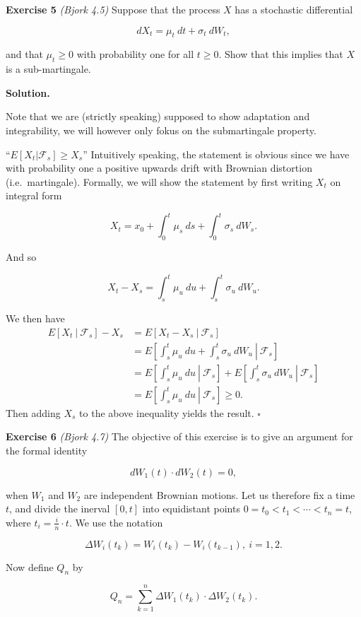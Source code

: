 \documentclass[a4paper,12pt,openany]{book}
\begin{document}
\textbf{Exercise 5} \emph{(Bjork 4.5)} Suppose that the process \(X\) has a stochastic differential

\[
dX_t=\mu_t\ dt+\sigma_t\ dW_t,
\]

and that \(\mu_t\ge 0\) with probability one for all \(t\ge 0\). Show that this implies that \(X\) is a sub-martingale.

\textbf{Solution.}

Note that we are (strictly speaking) supposed to show adaptation and integrability, we will however only fokus on the submartingale property.

``\(E[X_t\vert \mathcal{F}_s]\ge X_s\)'' Intuitively speaking, the statement is obvious since we have with probability one a positive upwards drift with Brownian distortion (i.e.~martingale). Formally, we will show the statement by first writing \(X_t\) on integral form

\[
X_t=x_0+\int_0^t\mu_s\ ds+\int_0^t\sigma_s\ dW_s.
\]

And so

\[
X_t-X_s=\int_s^t\mu_u\ du+\int_s^t\sigma_u\ dW_u.
\]

We then have
\begin{align*}
E[X_t\ \vert\ \mathcal{F}_s]-X_s&=E[X_t-X_s\ \vert\ \mathcal{F}_s]\\
&=E\left[\left.\int_s^t\mu_u\ du+\int_s^t\sigma_u\ dW_u\ \right\vert\ \mathcal{F}_s\right]\\
&=E\left[\left.\int_s^t\mu_u\ du\ \right\vert\ \mathcal{F}_s\right]+E\left[\left.\int_s^t\sigma_u\ dW_u\ \right\vert\ \mathcal{F}_s\right]\\
&=E\left[\left.\int_s^t\mu_u\ du\ \right\vert\ \mathcal{F}_s\right]\ge 0.
\end{align*}
Then adding \(X_s\) to the above inequality yields the result. \(\square\)

\textbf{Exercise 6} \emph{(Bjork 4.7)} The objective of this exercise is to give an argument for the formal identity

\[
dW_1(t)\cdot dW_2(t)=0,
\]

when \(W_1\) and \(W_2\) are independent Brownian motions. Let us therefore fix a time \(t\), and divide the inerval \([0,t]\) into equidistant points \(0=t_0<t_1<\cdots < t_n=t\), where \(t_i=\frac{i}{n}\cdot t\). We use the notation

\[
\Delta W_i(t_k)=W_i(t_k)-W_i(t_{k-1}),\ i=1,2.
\]

Now define \(Q_n\) by

\[
Q_n=\sum_{k=1}^n \Delta W_1(t_k)\cdot \Delta W_2(t_k).
\]
\end{document}
